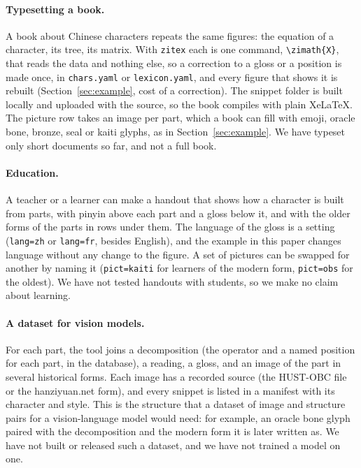 \documentclass[11pt]{article}
\newcommand{\cmd}[1]{\texttt{\textbackslash #1}}
\begin{document}
\paragraph{Typesetting a book.} A book about Chinese characters repeats the same figures: the equation of a character, its tree, its matrix. With
\texttt{zitex} each is one command, \cmd{zimath}\texttt{\{X\}}, that reads the data and nothing else, so a correction to a gloss or a position is made
once, in \texttt{chars.yaml} or \texttt{lexicon.yaml}, and every figure that shows it is rebuilt (Section~\ref{sec:example}, cost of a correction). The
snippet folder is built locally and uploaded with the source, so the book compiles with plain XeLaTeX. The picture row takes an image per part, which a
book can fill with emoji, oracle bone, bronze, seal or kaiti glyphs, as in Section~\ref{sec:example}. We have typeset only short documents so far, and not a
full book.

\paragraph{Education.} A teacher or a learner can make a handout that shows how a character is built from parts, with pinyin above each part and a
gloss below it, and with the older forms of the parts in rows under them. The language of the gloss is a setting (\texttt{lang=zh} or
\texttt{lang=fr}, besides English), and the example in this paper changes language without any change to the figure. A set of pictures can be
swapped for another by naming it (\texttt{pict=kaiti} for learners of the modern form, \texttt{pict=obs} for the oldest). We have not tested handouts with
students, so we make no claim about learning.

\paragraph{A dataset for vision models.} For each part, the tool joins a decomposition (the operator and a named position for each part, in the
database), a reading, a gloss, and an image of the part in several historical forms. Each image has a recorded source (the HUST-OBC file or the
hanziyuan.net form), and every snippet is listed in a manifest with its character and style. This is the structure that a dataset of image and structure pairs
for a vision-language model would need: for example, an oracle bone glyph paired with the decomposition and the modern form it is later written as. We have
not built or released such a dataset, and we have not trained a model on one.
\end{document}
